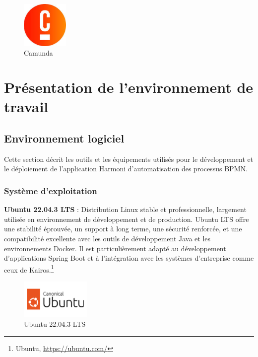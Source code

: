 \begin{figure}[H]
    \centering
    \includegraphics[width=0.2\textwidth]{Images/camunda.jpeg}
    \caption{Camunda}
    \label{fig:camunda}
\end{figure}

\section{Présentation de l'environnement de travail}

\subsection{Environnement logiciel}

Cette section décrit les outils et les équipements utilisés pour le développement et le déploiement de l'application Harmoni d'automatisation des processus BPMN.

\subsubsection{Système d'exploitation}
\begin{dinglist}{80}
    \item \textbf{Ubuntu 22.04.3 LTS} : Distribution Linux stable et professionnelle, largement utilisée en environnement de développement et de production. Ubuntu LTS offre une stabilité éprouvée, un support à long terme, une sécurité renforcée, et une compatibilité excellente avec les outils de développement Java et les environnements Docker. Il est particulièrement adapté au développement d'applications Spring Boot et à l'intégration avec les systèmes d'entreprise comme ceux de Kairos.\footnote{Ubuntu, \url{https://ubuntu.com/}}
\end{dinglist}

\begin{figure}[H]
    \centering
    \includegraphics[width=0.3\textwidth]{Images/ubuntu.png}
    \caption{Ubuntu 22.04.3 LTS}
    \label{fig:ubuntu}
\end{figure}

